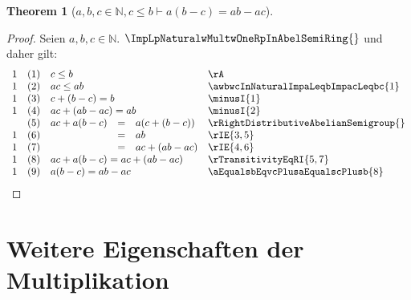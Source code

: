 \documentclass{book}
\theoremstyle{plain}
\newtheorem{theorem}{Theorem}
\theoremstyle{remark}
\theoremstyle{definition}
\begin{document}
\label{awbwcInNaturalwcLeqbImpaLpbMinuscRpEqualsabMinusac}
\begin{theorem}[\(a,b,c\in\mathbb{N},c\leq b\vdash a(b-c)=ab-ac\)]
\end{theorem}
\begin{proof}
Seien \(a,b,c\in\mathbb{N}\). \(\ImpLpNaturalwMultwOneRpInAbelSemiRing{}\) und daher gilt:
       \[
	\begin{array}{lllcll}
            1       &  (1)  & \multicolumn{3}{l}{c\leq b} & \rA \\
            1       &  (2)  & \multicolumn{3}{l}{ac\leq ab} & \awbwcInNaturalImpaLeqbImpacLeqbc{1} \\
            1       &  (3)  & \multicolumn{3}{l}{c+(b-c)=b} & \minusI{1} \\
            1       &  (4)  & \multicolumn{3}{l}{ac+(ab-ac)=ab} & \minusI{2} \\
                    &  (5)  & ac+a(b-c)&=&a(c+(b-c)) & \rRightDistributiveAbelianSemigroup{} \\
            1       &  (6)  &          &=& ab & \rIE{3,5} \\
            1       &  (7)  &          &=& ac+(ab-ac) & \rIE{4,6} \\
            1       &  (8)  & \multicolumn{3}{l}{ac+a(b-c)=ac+(ab-ac)} & \rTransitivityEqRI{5,7} \\
            1       &  (9)  & \multicolumn{3}{l}{a(b-c)=ab-ac} & \aEqualsbEqvcPlusaEqualscPlusb{8} \\
	\end{array}
        \]
\end{proof}

\section{Weitere Eigenschaften der Multiplikation}
\end{document}
